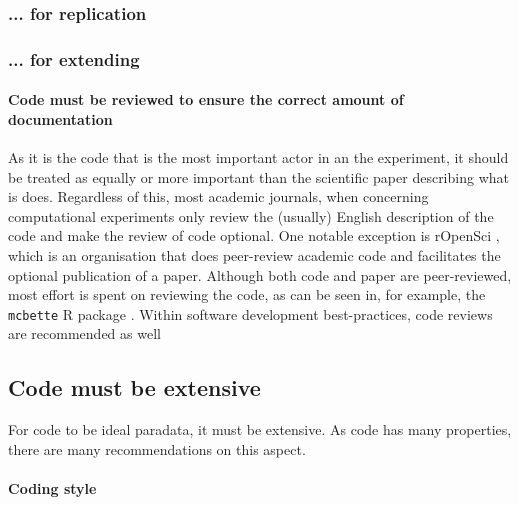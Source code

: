 \subsubsection{... for replication}

\subsubsection{... for extending}



\paragraph{Code must be reviewed to ensure the correct amount of documentation}

As it is the code that is the most important actor in an the experiment,
it should be treated as equally or more important than the scientific
paper describing what is does.
Regardless of this, most academic journals, 
when concerning computational experiments
only review the (usually) English description of the code
and make the review of code optional.
One notable exception is rOpenSci \cite{ram2018community},
which is an organisation that does peer-review academic code 
and facilitates the optional publication of a paper.
Although both code and paper are peer-reviewed,
most effort is spent on reviewing the code,
as can be seen in, for example, 
the \verb|mcbette| R package \cite{bilderbeek2020mcbette}.
Within software development best-practices, 
code reviews are recommended as well \cite{wilson2014best} 


%


\subsection{Code must be extensive}

For code to be ideal paradata, it must be extensive.
As code has many properties, there are many recommendations on this aspect.

\paragraph{Coding style}

